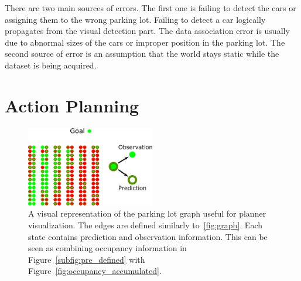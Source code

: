 There are two main sources of errors. The first one is failing to detect the
cars or assigning them to the wrong parking lot. Failing to detect a car
logically propagates from the visual detection part. The data association
error is usually due to abnormal sizes of the cars or improper position in the
parking lot. The second source of error is an assumption that the world stays
static while the dataset is being acquired.



\section{Action Planning}
\label{sec:planning_results}

\begin{figure}[t]
\begin{center}
\includegraphics[width=0.5\textwidth]{pictures/graph_observations.pdf}
\end{center}
\caption{A visual representation of the parking lot graph useful for planner visualization. The edges are defined similarly to~\ref{fig:graph}. Each state contains prediction and observation information. This can be seen as combining occupancy information in Figure~\ref{subfig:pre_defined} with Figure~\ref{fig:occupancy_accumulated}.}
\label{fig:graph_accumulated_illustration}
\end{figure}


